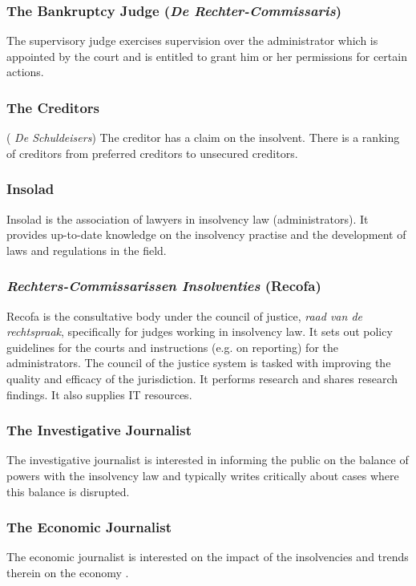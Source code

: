 \subsubsection{The Bankruptcy Judge (\textit{De Rechter-Commissaris})}
The supervisory judge exercises supervision over the administrator which is appointed by the court and is entitled to grant him or her permissions for certain actions.

\subsubsection{The Creditors}( \textit{De Schuldeisers})
The creditor has a claim on the insolvent. There is a ranking of creditors from preferred creditors to unsecured creditors.

\subsubsection{Insolad}
Insolad is the association of lawyers in insolvency law (administrators). It provides up-to-date knowledge on the insolvency practise and the development of laws and regulations in the field.

\subsubsection{\textit{Rechters-Commissarissen Insolventies} (Recofa)}
Recofa is the consultative body under the council of justice, \textit{raad van de rechtspraak}, specifically for judges working in insolvency law. It sets out policy guidelines for the courts and instructions (e.g. on reporting) for the administrators. The council of the justice system is tasked with improving the quality and efficacy of the jurisdiction. It performs research and shares research findings. It also supplies IT resources.

\subsubsection{The Investigative Journalist}
The investigative journalist is interested in informing the public on the balance of powers with the insolvency law and typically writes critically about cases where this balance is disrupted.

\subsubsection{The Economic Journalist}
The economic journalist is interested on the impact of the insolvencies and trends therein on the economy .
